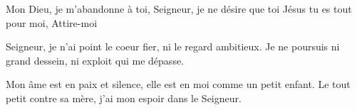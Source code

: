 

Mon Dieu, je m'abandonne à toi, Seigneur, je ne désire que toi
Jésus tu es tout pour moi, Attire-moi

Seigneur, je n'ai point le coeur fier, ni le regard ambitieux.
Je ne poursuis ni grand dessein, ni exploit qui me dépasse.

Mon âme est en paix et silence, elle est en moi comme un petit enfant.
Le tout petit contre sa mère, j'ai mon espoir dans le Seigneur.

